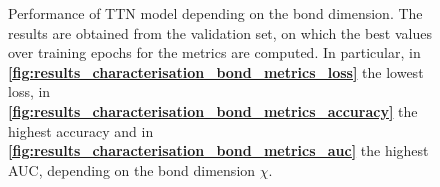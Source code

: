 \documentclass[../main/main.tex]{subfiles}
\begin{document}
\begin{figure}[!h]
\begin{minipage}[c]{0.333\linewidth}
{            \label{fig:results_characterisation_bond_metrics_auc}
        }
    \end{minipage}%
    \caption{Performance of TTN model depending on the bond dimension. The results are obtained from the validation set, on which the best values over training epochs for the metrics are computed. In particular, in \textbf{\ref{fig:results_characterisation_bond_metrics_loss}} the lowest loss, in \textbf{\ref{fig:results_characterisation_bond_metrics_accuracy}} the highest accuracy and in \textbf{\ref{fig:results_characterisation_bond_metrics_auc}} the highest AUC, depending on the bond dimension \( \chi \).}
    \label{fig:results_characterisation_bond_metrics}
\end{figure}


\begin{figure}[!h]
   \begin{minipage}[c]{0.50\textwidth}
        \vspace{0pt}
        \centering
    \end{minipage}%
    \begin{minipage}[c]{0.50\textwidth}
        \vspace{0pt}
        \centering
\end{minipage}
\end{figure}
\end{document}
